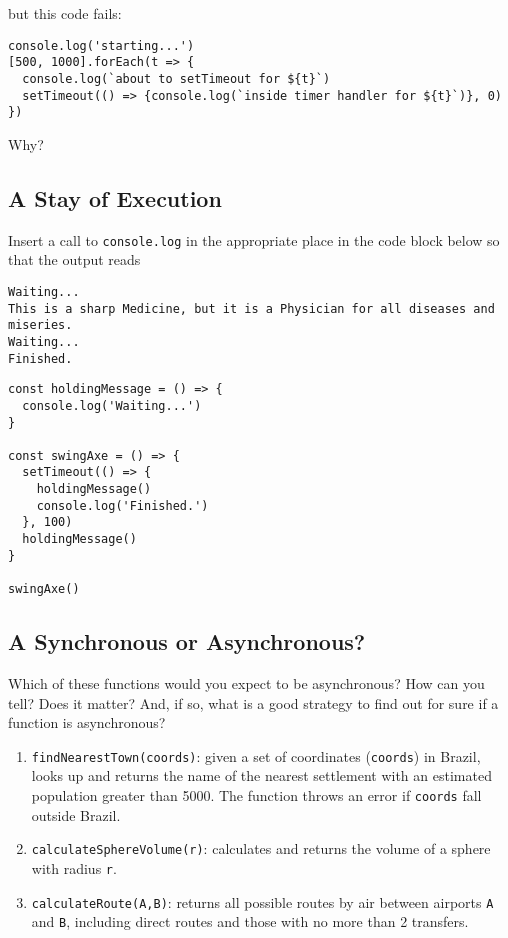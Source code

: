 \noindent
but this code fails:

\begin{verbatim}
console.log('starting...')
[500, 1000].forEach(t => {
  console.log(`about to setTimeout for ${t}`)
  setTimeout(() => {console.log(`inside timer handler for ${t}`)}, 0)
})
\end{verbatim}

Why?

\subsection*{A Stay of Execution}
Insert a call to \texttt{console.log} in the appropriate place in the code block below
so that the output reads

\begin{verbatim}
Waiting...
This is a sharp Medicine, but it is a Physician for all diseases and miseries.
Waiting...
Finished.
\end{verbatim}

\begin{verbatim}
const holdingMessage = () => {
  console.log('Waiting...')
}

const swingAxe = () => {
  setTimeout(() => {
    holdingMessage()
    console.log('Finished.')
  }, 100)
  holdingMessage()
}

swingAxe()
\end{verbatim}

\subsection*{A Synchronous or Asynchronous?}
Which of these functions would you expect to be asynchronous?
How can you tell?
Does it matter?
And, if so, what is a good strategy to find out for sure if a function is asynchronous?

\begin{enumerate}
\item
  \texttt{findNearestTown(coords)}: given a set of coordinates (\texttt{coords}) in Brazil,
  looks up and returns the name of the nearest settlement with an estimated population greater than 5000.
  The function throws an error if \texttt{coords} fall outside Brazil.
\item
  \texttt{calculateSphereVolume(r)}: calculates and returns the volume of a sphere with radius \texttt{r}.
\item
  \texttt{calculateRoute(A,B)}: returns all possible routes by air between airports \texttt{A} and \texttt{B},
  including direct routes and those with no more than 2 transfers.
\end{enumerate}

